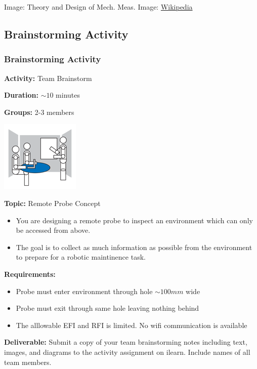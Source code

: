 \documentclass[fleqn]{beamer} %
\newcommand{\sectionIsubsectionIIItitle}{Brainstorming Activity}
\begin{document}
\begin{frame}
				{\tiny Image: Theory and Design of Mech. Meas. \hspace{20mm} Image: \href{https://en.wikipedia.org/wiki/Thermocouple}{Wikipedia} }
			\end{frame}

		\subsection{\sectionIsubsectionIIItitle}\label{sectionIsubsectionIII}
			\begin{frame} 
				\frametitle{\sectionIsubsectionIIItitle}
				
				\begin{multicols}{2}
					\tiny

					{\bf Activity:} Team Brainstorm

					{\bf Duration:} $\sim 10$ minutes

					{\bf Groups:} 2-3 members

					\includegraphics[scale=0.5]{images/Brainstorm_room.png}

					{\bf Topic:} Remote Probe Concept
					\begin{itemize}
						\item You are designing a remote probe to inspect an environment which can only be accessed from above. 
						\item The goal is to collect as much information as possible from the environment to prepare for a robotic maintinence task. 
			        \end{itemize}

			    \end{multicols}	

			    {\bf Requirements:}	
				\begin{itemize}
					\item Probe must enter environment through hole $\sim 100mm$ wide 
					\item Probe must exit through same hole leaving nothing behind
					\item The alllowable EFI and RFI is limited. No wifi communication is available \vspace{4mm}
				\end{itemize}

				{\bf Deliverable:} Submit a copy of your team brainstorming notes including text, images, and diagrams to the activity assignment on ilearn. Include names of all team members.

			\end{frame}	
\end{document}

